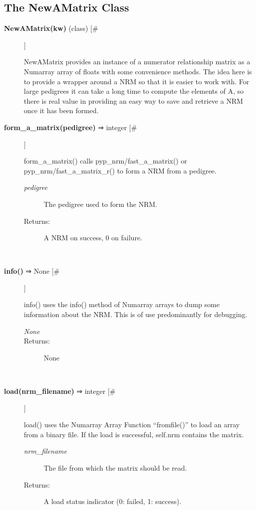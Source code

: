 \documentclass[10pt]{article}
\begin{document}
\subsection*{The NewAMatrix Class}
\begin{description}
\item[\textbf{NewAMatrix(kw)}
 (class) [\#]]

 NewAMatrix provides an instance of a numerator relationship matrix as a Numarray array of floats with some convenience methods. The idea here is to provide a wrapper around a NRM so that it is easier to work with. For large pedigrees it can take a long time to compute the elements of A, so there is real value in providing an easy way to save and retrieve a NRM once it has been formed.

\item[\textbf{form\_a\_matrix(pedigree)}
 ⇒ integer [\#]]

 form\_a\_matrix() calls pyp\_nrm/fast\_a\_matrix() or pyp\_nrm/fast\_a\_matrix\_r() to form a NRM from a pedigree.
\begin{description}
\item[\emph{pedigree}
] The pedigree used to form the NRM.
\item[Returns:] A NRM on success, 0 on failure.

\end{description}
\\ 

\item[\textbf{info()}
 ⇒ None [\#]]

 info() uses the info() method of Numarray arrays to dump some information about the NRM. This is of use predominantly for debugging.
\begin{description}
\item[\emph{None}
]
\item[Returns:] None

\end{description}
\\ 

\item[\textbf{load(nrm\_filename)}
 ⇒ integer [\#]]

 load() uses the Numarray Array Function ``fromfile()'' to load an array from a binary file. If the load is successful, self.nrm contains the matrix.
\begin{description}
\item[\emph{nrm\_filename}
] The file from which the matrix should be read.
\item[Returns:] A load status indicator (0: failed, 1: success).


\end{description}
\end{description}
\end{document}
